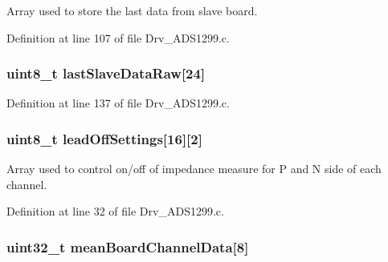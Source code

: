 Array used to store the last data from slave board. 



Definition at line 107 of file Drv\+\_\+\+A\+D\+S1299.\+c.

\subsubsection[{\texorpdfstring{last\+Slave\+Data\+Raw}{lastSlaveDataRaw}}]{\setlength{\rightskip}{0pt plus 5cm}uint8\+\_\+t last\+Slave\+Data\+Raw\mbox{[}24\mbox{]}}\hypertarget{group__ADS1299__Library_ga72ed7b344555cffff8c860e89e44afd6}{}\label{group__ADS1299__Library_ga72ed7b344555cffff8c860e89e44afd6}


Definition at line 137 of file Drv\+\_\+\+A\+D\+S1299.\+c.

\subsubsection[{\texorpdfstring{lead\+Off\+Settings}{leadOffSettings}}]{\setlength{\rightskip}{0pt plus 5cm}uint8\+\_\+t lead\+Off\+Settings\mbox{[}16\mbox{]}\mbox{[}2\mbox{]}}\hypertarget{group__ADS1299__Library_ga51cd0f121d75eaf14e9e4847f125dd8a}{}\label{group__ADS1299__Library_ga51cd0f121d75eaf14e9e4847f125dd8a}


Array used to control on/off of impedance measure for P and N side of each channel. 



Definition at line 32 of file Drv\+\_\+\+A\+D\+S1299.\+c.

\subsubsection[{\texorpdfstring{mean\+Board\+Channel\+Data}{meanBoardChannelData}}]{\setlength{\rightskip}{0pt plus 5cm}uint32\+\_\+t mean\+Board\+Channel\+Data\mbox{[}8\mbox{]}}\hypertarget{group__ADS1299__Library_ga4b3ef40d05b115ef45424a733bcbe230}{}\label{group__ADS1299__Library_ga4b3ef40d05b115ef45424a733bcbe230}


